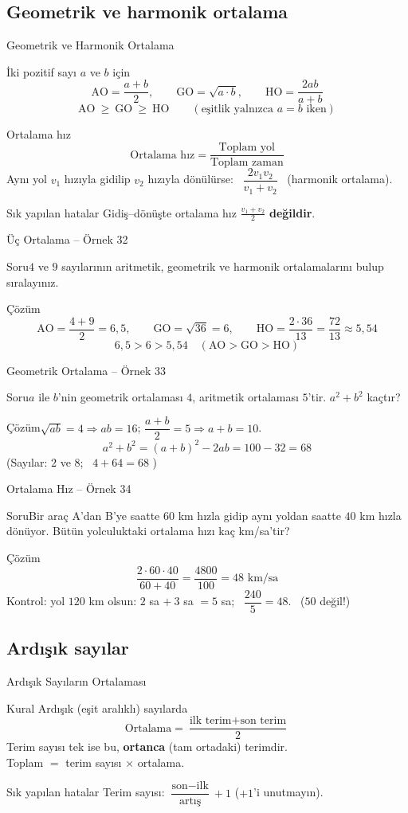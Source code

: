 \documentclass[aspectratio=169,11pt]{beamer}
\newcommand{\soru}[3]{%
\begin{frame}{#1}
  \begin{block}{Soru}\large #2\end{block}
  \pause
  \begin{exampleblock}{Çözüm}\large #3\end{exampleblock}
\end{frame}}
\begin{document}
\subsection{Geometrik ve harmonik ortalama}
\begin{frame}{Geometrik ve Harmonik Ortalama}
\begin{block}{İki pozitif sayı \(a\) ve \(b\) için}
\[\text{AO}=\frac{a+b}{2},\qquad \text{GO}=\sqrt{a\cdot b},\qquad \text{HO}=\frac{2ab}{a+b}\]
\[\text{AO}\ \ge\ \text{GO}\ \ge\ \text{HO}\qquad(\text{eşitlik yalnızca } a=b \text{ iken})\]
\end{block}
\begin{block}{Ortalama hız}
\[\text{Ortalama hız}=\frac{\text{Toplam yol}}{\text{Toplam zaman}}\]
Aynı yol \(v_1\) hızıyla gidilip \(v_2\) hızıyla dönülürse: \ \(\dfrac{2v_1v_2}{v_1+v_2}\) \ (harmonik ortalama).
\end{block}
\begin{alertblock}{Sık yapılan hatalar}
Gidiş--dönüşte ortalama hız \(\frac{v_1+v_2}{2}\) \textbf{değildir}.
\end{alertblock}
\end{frame}

\soru{Üç Ortalama -- Örnek 32}
{\(4\) ve \(9\) sayılarının aritmetik, geometrik ve harmonik ortalamalarını bulup sıralayınız.}
{\[\text{AO}=\frac{4+9}{2}=6{,}5,\qquad \text{GO}=\sqrt{36}=6,\qquad \text{HO}=\frac{2\cdot 36}{13}=\frac{72}{13}\approx 5{,}54\]
\[6{,}5>6>5{,}54\quad(\text{AO}>\text{GO}>\text{HO})\]}

\soru{Geometrik Ortalama -- Örnek 33}
{\(a\) ile \(b\)'nin geometrik ortalaması \(4\), aritmetik ortalaması \(5\)'tir. \(a^2+b^2\) kaçtır?}
{\(\sqrt{ab}=4\Rightarrow ab=16\); \quad \(\dfrac{a+b}{2}=5\Rightarrow a+b=10\).
\[a^2+b^2=(a+b)^2-2ab=100-32=68\]
(Sayılar: \(2\) ve \(8\); \ \(4+64=68\) \checkmark)}

\soru{Ortalama Hız -- Örnek 34}
{Bir araç A'dan B'ye saatte \(60\) km hızla gidip aynı yoldan saatte \(40\) km hızla dönüyor. Bütün yolculuktaki ortalama hızı kaç km/sa'tir?}
{\[\frac{2\cdot 60\cdot 40}{60+40}=\frac{4800}{100}=48\text{ km/sa}\]
Kontrol: yol \(120\) km olsun: \(2\) sa \(+\ 3\) sa \(=5\) sa; \ \(\dfrac{240}{5}=48\). \ (\(50\) değil!)}

\subsection{Ardışık sayılar}
\begin{frame}{Ardışık Sayıların Ortalaması}
\begin{block}{Kural}
Ardışık (eşit aralıklı) sayılarda
\[\text{Ortalama}=\frac{\text{ilk terim}+\text{son terim}}{2}\]
Terim sayısı tek ise bu, \textbf{ortanca} (tam ortadaki) terimdir.\\[2pt]
Toplam \(=\) terim sayısı \(\times\) ortalama.
\end{block}
\begin{alertblock}{Sık yapılan hatalar}
Terim sayısı: \(\dfrac{\text{son}-\text{ilk}}{\text{artış}}+1\) \quad (\(+1\)'i unutmayın).
\end{alertblock}
\end{frame}
\end{document}
